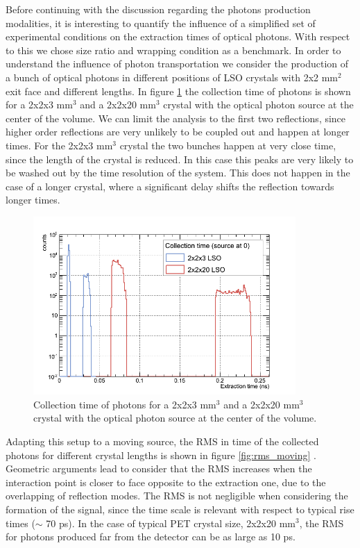 Before continuing with the discussion regarding the photons production modalities, it is interesting to quantify the influence of a simplified set of experimental conditions on the extraction times of optical photons. With respect to this we chose size ratio and wrapping condition as a benchmark.
In order to understand the influence of photon transportation we consider the production of a bunch of optical photons in different positions of LSO crystals with 2x2 mm$^{2}$ exit face and different lengths. In figure \ref{fig:refl_example} the collection time of photons is shown for a 2x2x3 mm$^{3}$ and a 2x2x20 mm$^{3}$ crystal with the optical photon source at the center of the volume. We can limit the analysis to the first two reflections, since higher order reflections are very unlikely to be coupled out and happen at longer times. 
For the 2x2x3 mm$^{3}$ crystal the two bunches happen at very close time, since the length of the crystal is reduced. In this case this peaks are very likely to be washed out by the time resolution of the system. This does not happen in the case of a longer crystal, where a significant delay shifts the reflection towards longer times.

\begin{figure}[htbp]
\begin{center}
\includegraphics[width=10cm]{../Pictures/Chapter_6/reflections.png}
\end{center}
\caption[Collection time for optical source]{Collection time of photons for a 2x2x3 mm$^{3}$ and a 2x2x20 mm$^{3}$ crystal with the optical photon source at the center of the volume.}
\label{fig:refl_example}
\end{figure}
Adapting this setup to a moving source, the RMS in time of the collected photons for different crystal lengths is shown in figure \ref{fig:rms_moving} . Geometric arguments lead to consider that the RMS increases when the interaction point is closer to face opposite to the extraction one, due to the overlapping of reflection modes. The RMS is not negligible when considering the formation of the signal, since the time scale is relevant with respect to typical rise times ($\sim$ 70 ps). In the case of typical PET crystal size, 2x2x20 mm$^{3}$, the RMS for photons produced far from the detector can be as large as 10 ps.

